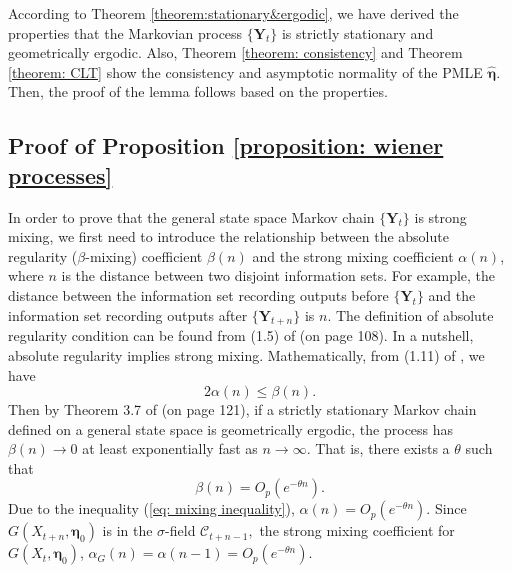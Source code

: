 \documentclass{article}
\theoremstyle{definition}
\begin{document}
According to Theorem \ref{theorem:stationary&ergodic}, we have derived the properties that the Markovian process $\{\bm{Y}_t\}$ is strictly stationary and geometrically ergodic. Also, Theorem \ref{theorem: consistency} and Theorem \ref{theorem: CLT} show the consistency and asymptotic normality of the PMLE $\hat{\bm{\eta}}$. Then, the proof of the lemma follows based on the properties.
\subsection{Proof of Proposition \ref{proposition: wiener processes}}
\label{app: proof of wiener process}

In order to prove that the general state space Markov chain $\{\bm{Y}_t\}$ is strong mixing, we first need to introduce the relationship between the absolute regularity ($\beta$-mixing) coefficient $\beta(n)$ and the strong mixing coefficient $\alpha(n)$, where $n$ is the distance between two disjoint information sets. For example, the distance between the information set recording outputs before $\{\bm{Y}_t\}$ and the information set recording outputs after $\{\bm{Y}_{t+n}\}$ is $n$.
The definition of absolute regularity condition can be found from (1.5) of \cite{bradley2005basic} (on page 108). In a nutshell, absolute regularity implies strong mixing. Mathematically, from (1.11) of \cite{bradley2005basic}, we have 
\begin{equation}
\label{eq: mixing inequality}
    2\alpha(n) \leq \beta(n).
\end{equation}
Then by Theorem 3.7 of \cite{bradley2005basic} (on page 121), if a strictly stationary Markov chain defined on a general state space is geometrically ergodic, the process has $\beta(n)\rightarrow 0$ at least exponentially fast as $n \rightarrow \infty$. That is, there exists a $\theta$ such that 
\begin{equation*}
    \beta(n) =O_p(e^{-\theta n}).
\end{equation*}
Due to the inequality (\ref{eq: mixing inequality}), $\alpha(n) = O_p(e^{-\theta n}).$ Since $G(X_{t+n},\bm{\eta}_0)$ is in the $\sigma$-field $\mathcal{C}_{t+n-1},$ the strong mixing coefficient for $G(X_t,\bm{\eta}_0)$, $\alpha_G(n) = \alpha(n-1) = O_p(e^{-\theta n})$. 
\end{document}

